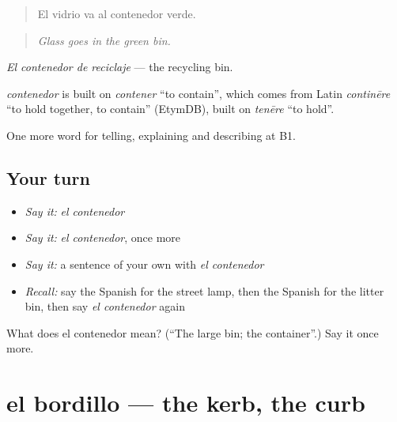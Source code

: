 \begin{quote}
El vidrio va al contenedor verde.
\end{quote}

\begin{quote}
\emph{Glass goes in the green bin.}
\end{quote}

\emph{El contenedor de reciclaje} — the recycling bin.

\begin{cousinweb}
\emph{contenedor} is built on \emph{contener} \textquotedblleft{}to contain\textquotedblright{}, which comes from Latin \emph{continēre} \textquotedblleft{}to hold together, to contain\textquotedblright{} (EtymDB), built on \emph{tenēre} \textquotedblleft{}to hold\textquotedblright{}.
\end{cousinweb}

\begin{grammarlens}[title={What you've built}]
One more word for telling, explaining and describing at B1.
\end{grammarlens}

\subsection*{Your turn}
\begin{itemize}
\raggedright
  \item \emph{Say it:} \emph{el contenedor}
  \item \emph{Say it:} \emph{el contenedor}, once more
  \item \emph{Say it:} a sentence of your own with \emph{el contenedor}
  \item \emph{Recall:} say the Spanish for the street lamp, then the Spanish for the litter bin, then say \emph{el contenedor} again
\end{itemize}

\begin{tcolorbox}[breakable,colback=teal!4,colframe=teal!35!black,title={Before you move on}]
What does el contenedor mean? (\textquotedblleft{}The large bin; the container\textquotedblright{}.) Say it once more.
\end{tcolorbox}
\section[el bordillo]{el bordillo — the kerb, the curb}

\label{lesson:ES-C682-bordillo}



